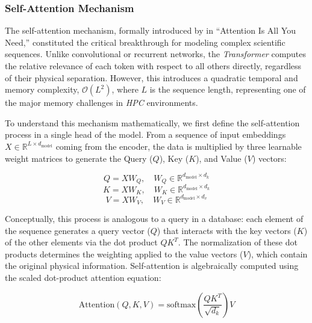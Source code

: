 \subsubsection{Self-Attention Mechanism}

The self-attention mechanism, formally introduced by \textcite{ar:attention} in ``Attention Is All You Need,'' constituted the critical breakthrough for modeling complex scientific sequences. Unlike convolutional or recurrent networks, the \textit{Transformer} computes the relative relevance of each token with respect to all others directly, regardless of their physical separation. However, this introduces a quadratic temporal and memory complexity, $\mathcal{O}\left(L^2\right)$, where $L$ is the sequence length, representing one of the major memory challenges in \textit{\gls{HPC}} environments.

To understand this mechanism mathematically, we first define the self-attention process in a single head of the model. From a sequence of input embeddings $X \in \mathbb{R}^{L \times d_{\text{model}}}$ coming from the encoder, the data is multiplied by three learnable weight matrices to generate the Query ($Q$), Key ($K$), and Value ($V$) vectors:

\begin{equation}
Q = X W_Q, \quad W_Q \in \mathbb{R}^{d_{\text{model}} \times d_k}
\label{eq:query_proj}
\end{equation}
\begin{equation}
K = X W_K, \quad W_K \in \mathbb{R}^{d_{\text{model}} \times d_k}
\label{eq:key_proj}
\end{equation}
\begin{equation}
V = X W_V, \quad W_V \in \mathbb{R}^{d_{\text{model}} \times d_v}
\label{eq:value_proj}
\end{equation}

Conceptually, this process is analogous to a query in a database: each element of the sequence generates a query vector ($Q$) that interacts with the key vectors ($K$) of the other elements via the dot product $Q K^T$. The normalization of these dot products determines the weighting applied to the value vectors ($V$), which contain the original physical information. Self-attention is algebraically computed using the scaled dot-product attention equation:

\begin{equation}
\text{Attention}\left(Q, K, V\right) = \text{softmax}\left(\dfrac{Q K^T}{\sqrt{d_k}}\right) V
\label{eq:attention_formula}
\end{equation}

